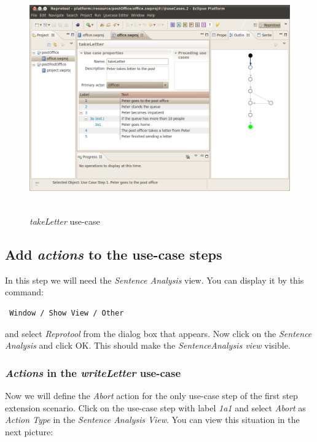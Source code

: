 \begin{figure}[ht]
  \centering
  \includegraphics[height=280pt]{images/reprotoolUCEditor}
  \caption{\emph{takeLetter} use-case}
  \label{fig:reprotoolUCEditor}
\end{figure}

\newpage

\subsection{Add \emph{actions} to the use-case steps}

In this step we will need the \emph{Sentence Analysis} view. You can display it by this command:
\begin{verbatim}
 Window / Show View / Other
\end{verbatim}

and select \emph{Reprotool} from the dialog box that appears. Now click on the \emph{Sentence Analysis} and click OK. This should make
the \emph{SentenceAnalysis view} visible.

\subsubsection{\emph{Actions} in the \emph{writeLetter} use-case}

Now we will define the \emph{Abort} action for the only use-case step of the first step extension scenario. Click on the use-case step
with label \emph{1a1} and select \emph{Abort} as \emph{Action Type} in the \emph{Sentence Analysis View}. You can view this situation
in the next picture:

